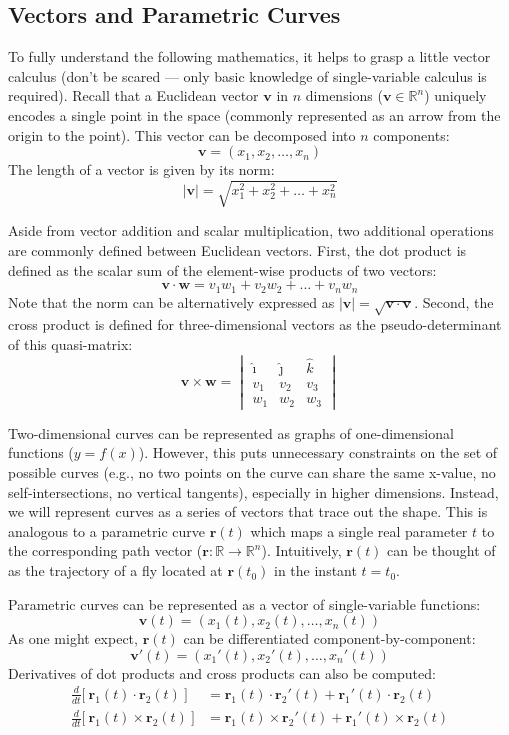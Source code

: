 \documentclass{article}
\newcommand{\norm}[1]{\lvert #1 \rvert}
\begin{document}
\subsection{Vectors and Parametric Curves}
To fully understand the following mathematics, it helps to grasp a little vector calculus (don't be scared --- only basic knowledge of single-variable calculus is required). Recall that a Euclidean vector $\mathbf{v}$ in $n$ dimensions ($\mathbf{v} \in \mathbb{R}^n$) uniquely encodes a single point in the space (commonly represented as an arrow from the origin to the point). This vector can be decomposed into $n$ components:
$$
\mathbf{v} = (x_1, x_2, \ldots, x_n)
$$
The length of a vector is given by its norm:
$$
\norm{\mathbf{v}} = \sqrt{x_1^2 + x_2^2 + \ldots + x_n^2}
$$

Aside from vector addition and scalar multiplication, two additional operations are commonly defined between Euclidean vectors. First, the dot product is defined as the scalar sum of the element-wise products of two vectors:
$$
\mathbf{v} \cdot \mathbf{w} = v_1w_1 + v_2w_2 + ... + v_nw_n
$$
Note that the norm can be alternatively expressed as $\norm{\mathbf{v}} = \sqrt{\mathbf{v} \cdot \mathbf{v}}$. Second, the cross product is defined for three-dimensional vectors as the pseudo-determinant of this quasi-matrix:
$$
\mathbf{v} \times \mathbf{w} =
\begin{vmatrix}
    \hat{\imath} & \hat{\jmath} & \hat{k}\\[4pt]
    v_1 & v_2 & v_3\\[4pt]
    w_1 & w_2 & w_3
\end{vmatrix}
$$

Two-dimensional curves can be represented as graphs of one-dimensional functions ($y = f(x)$). However, this puts unnecessary constraints on the set of possible curves (e.g., no two points on the curve can share the same x-value, no self-intersections, no vertical tangents), especially in higher dimensions. Instead, we will represent curves as a series of vectors that trace out the shape. This is analogous to a parametric curve $\mathbf{r}(t)$ which maps a single real parameter $t$ to the corresponding path vector ($\mathbf{r}:\mathbb R\to\mathbb R^n$). Intuitively, $\mathbf{r}(t)$ can be thought of as the trajectory of a fly located at $\mathbf{r}(t_0)$ in the instant $t=t_0$.

Parametric curves can be represented as a vector of single-variable functions:
$$
\mathbf{v}(t) = (x_1(t), x_2(t), \ldots, x_n(t))
$$
As one might expect, $\mathbf{r}(t)$ can be differentiated component-by-component:
$$
\mathbf{v}'(t) = (x_1'(t), x_2'(t), \ldots, x_n'(t))
$$
Derivatives of dot products and cross products can also be computed:
\begin{equation*}
\begin{split}
    \frac{d}{dt} \Big[\ \mathbf{r}_1(t) \cdot \mathbf{r}_2(t)\ \Big] &= \mathbf{r}_1(t) \cdot \mathbf{r}_2'(t) +\mathbf{r}_1'(t) \cdot \mathbf{r}_2(t) \\
    \frac{d}{dt} \Big[\ \mathbf{r}_1(t) \times \mathbf{r}_2(t)\ \Big] &= \mathbf{r}_1(t) \times \mathbf{r}_2'(t) +\mathbf{r}_1'(t) \times \mathbf{r}_2(t)
\end{split}
\end{equation*}
\end{document}
